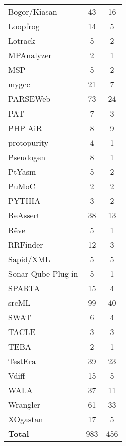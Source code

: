 \begin{longtable}{ l c c }
   Bogor/Kiasan & 43 & 16 \\
   Loopfrog & 14 & 5 \\
   Lotrack & 5 & 2 \\
   MPAnalyzer & 2 & 1 \\
   MSP & 5 & 2 \\
   mygcc & 21 & 7 \\
   PARSEWeb & 73 & 24 \\
   PAT & 7 & 3 \\
   PHP AiR & 8 & 9 \\
   protopurity & 4 & 1 \\
   Pseudogen & 8 & 1 \\
   PtYasm & 5 & 2 \\
   PuMoC & 2 & 2 \\
   PYTHIA & 3 & 2 \\
   ReAssert & 38 & 13 \\
   Rêve & 5 & 1 \\
   RRFinder & 12 & 3 \\
   Sapid/XML & 5 & 5 \\
   Sonar Qube Plug-in & 5 & 1 \\
   SPARTA & 15 & 4 \\
   srcML & 99 & 40 \\
   SWAT & 6 & 4 \\
   TACLE & 3 & 3 \\
   TEBA & 2 & 1 \\
   TestEra & 39 & 23 \\
   Vdiff & 15 & 5 \\
   WALA & 37 & 11 \\
   Wrangler & 61 & 33 \\
   XOgastan & 17 & 5 \\
  \hline
  {\bf Total} & 983 & 456 \\
\end{longtable}

